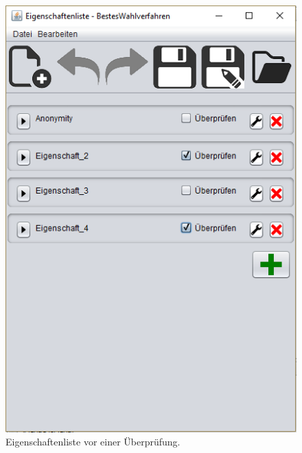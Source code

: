 \documentclass[a4paper]{scrreprt}
\begin{document}
\begin{figure}[H]
\begin{minipage}{.5\textwidth}
  \centering
  \includegraphics[scale=0.5]{Eigenschaften-Liste.png}
  \caption{Eigenschaftenliste vor einer Überprüfung.}
  \label{Eigenschaften-Liste-vor}
\end{minipage}
\begin{minipage}{.5\textwidth}
  \centering

\end{minipage}
\end{figure}
\end{document}

